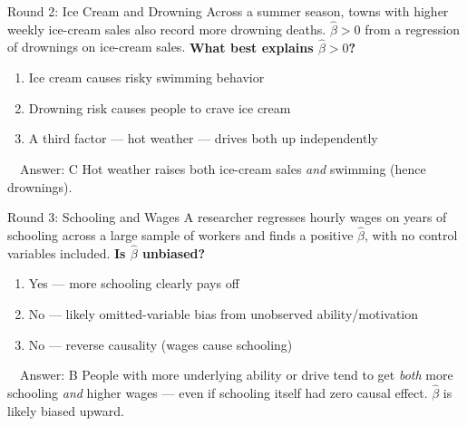 \documentclass[11pt,aspectratio=169]{beamer}
\begin{document}
\begin{frame}{Round 2: Ice Cream and Drowning}
  \small
  Across a summer season, towns with higher weekly ice-cream sales also record more drowning deaths. \(\hat\beta > 0\) from a regression of drownings on ice-cream sales.
  \vspace{0.5em}
  \textbf{What best explains \(\hat\beta > 0\)?}
  \begin{enumerate}
    \item[\textbf{A}] Ice cream causes risky swimming behavior
    \item[\textbf{B}] Drowning risk causes people to crave ice cream
    \item[\textbf{C}] A third factor --- hot weather --- drives both up independently
  \end{enumerate}
  \pause
  \vspace{0.3em}
  \begin{alertblock}{\faCheckCircle\ \ Answer: C}
    Hot weather raises both ice-cream sales \emph{and} swimming (hence drownings).  
  \end{alertblock}
\end{frame}

\begin{frame}{Round 3: Schooling and Wages}
  \small
  A researcher regresses hourly wages on years of schooling across a large sample of workers and finds a positive \(\hat\beta\), with no control variables included.
  \vspace{0.5em}
  \textbf{Is \(\hat\beta\) unbiased?}
  \begin{enumerate}
    \item[\textbf{A}] Yes --- more schooling clearly pays off
    \item[\textbf{B}] No --- likely omitted-variable bias from unobserved ability/motivation
    \item[\textbf{C}] No --- reverse causality (wages cause schooling)
  \end{enumerate}
  \pause
  \vspace{0.3em}
  \begin{alertblock}{\faCheckCircle\ \ Answer: B}
    People with more underlying ability or drive tend to get \emph{both} more schooling \emph{and} higher wages --- even if schooling itself had zero causal effect. \(\hat\beta\) is likely biased upward.
  \end{alertblock}
\end{frame}
\end{document}
